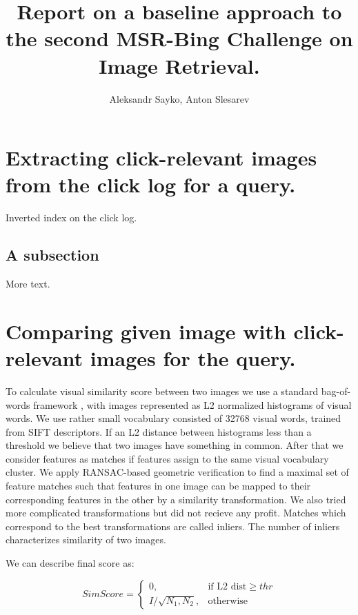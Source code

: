 \documentclass[11pt]{article} %
\title{Report on a baseline approach to the second MSR-Bing Challenge on Image Retrieval.}
\author{Aleksandr Sayko, Anton Slesarev}
\begin{document}
\maketitle


\section{Extracting click-relevant images from the  click log for a query.}

Inverted index on the click log.

\subsection{A subsection}

More text.

\section{Comparing given image with click-relevant images for the query.}
To calculate visual similarity score between two images we use a standard bag-of-words
framework \cite{Sivic03}, with images represented as L2 normalized histograms of
visual words. We use rather small vocabulary consisted of 32768 visual
words, trained from SIFT descriptors. If an L2 distance between
histograms less than a threshold we believe that two images have
something in common. After that we consider features as matches if
features assign to the same visual vocabulary cluster. We apply
RANSAC-based geometric verification to find a maximal set of feature
matches such that features in one image can be mapped to their
corresponding features in the other by a similarity transformation.
We also tried more complicated transformations but did not recieve any
profit. Matches which correspond to the best transformations are
called inliers. The number of inliers characterizes similarity of two images.

We can describe final score as:

$$
    SimScore = 
\begin{cases}
    0,& \text{if L2 dist} \geq thr\\
    I / \sqrt{N_1, N_2},              & \text{otherwise}
\end{cases}
$$
\end{document}
